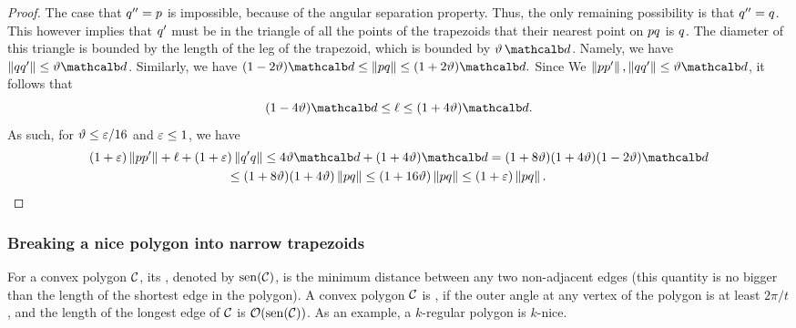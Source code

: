 \documentclass[12pt]{article}%
\begin{document}
\begin{proof}
    The case that $q''=p$ is impossible, because of the angular
    separation property. Thus, the only remaining possibility is that
    $q'' = q$. This however implies that $q'$ must be in the
    triangle of all the points of the trapezoids that their nearest
    point on $p q$ is $q$. The diameter of this triangle is
    bounded by the length of the leg of the trapezoid, which is
    bounded by $\epsA \, \diamC$. Namely, we have
    $\dY{\pb}{\pb'} \leq \epsA \diamC$. Similarly, we have
    \begin{math}
        (1 -  2\epsA) \diamC%
        \leq%
        \dY{\pa}{\pb}
        \leq%
        (1+2\epsA)\diamC.        
    \end{math}
    Since 
    We  $\dY{\pa}{\pa'}, \dY{\pb}{\pb'} \leq \epsA \diamC$, it follows
    that
    \begin{equation*}
        (1-4\epsA) \diamC%
        \leq%
        \ell%
        \leq%
        (1+4\epsA)\diamC.
    \end{equation*}
    As such, for $\vartheta \leq \varepsilon/16$ and $\varepsilon \leq 1$, we have
    \begin{align*}
      (1+\eps)\dY{\pa}{\pa'} + \ell + (1+\eps)
      \dY{\pb'}{\pb}
      &\leq%
        4 \epsA \diamC + (1+4\epsA)\diamC
        =%
        (1+8\epsA)(1+4\epsA) (1 -  2\epsA) \diamC
      \\&
      \hspace{-1cm}\leq%
      (1+8\epsA)(1+4\epsA) \dY{\pa}{\pb}
      \leq 
      (1+16\epsA) \dY{\pa}{\pb}
      \leq
      (1+\eps) \dY{\pa}{\pb}.
    \end{align*}
\end{proof}

\newcommand{\senseX}[1]{\Mh{\mathrm{sen}} \pth{#1}}%

\subsubsection{Breaking a nice polygon into narrow %
   trapezoids}

For a convex polygon $\mathcal{C}$, its , denoted by
$\senseX{\Body}$, is the minimum distance between any two non-adjacent
edges (this quantity is no bigger than the length of the shortest edge
in the polygon).  A convex polygon $\mathcal{C}$ is , if the
outer angle at any vertex of the polygon is at least $2\pi/t$, and the
length of the longest edge of $\mathcal{C}$ is $\Of(\senseX{\Body})$.  As an
example, a $k$-regular polygon is $k$-nice.
\end{document}
